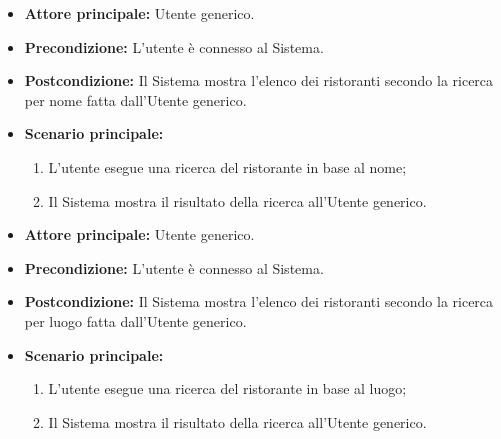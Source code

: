 \label{usecase:Ricerca ristoranti per nome}
\begin{itemize}
	\item \textbf{Attore principale:} Utente generico.

	\item \textbf{Precondizione:} L'utente è connesso al Sistema.

	\item \textbf{Postcondizione:} Il Sistema mostra l'elenco dei ristoranti secondo la ricerca per nome fatta dall'Utente generico.

	\item \textbf{Scenario principale:}
	      \begin{enumerate}
		      \item L'utente esegue una ricerca del ristorante in base al nome;
		      \item Il Sistema mostra il risultato della ricerca all'Utente generico.
	      \end{enumerate}
\end{itemize}

\label{usecase:Ricerca ristoranti per luogo}
\begin{itemize}
	\item \textbf{Attore principale:} Utente generico.

	\item \textbf{Precondizione:} L'utente è connesso al Sistema.

	\item \textbf{Postcondizione:} Il Sistema mostra l'elenco dei ristoranti secondo la ricerca per luogo fatta dall'Utente generico.

	\item \textbf{Scenario principale:}
	      \begin{enumerate}
		      \item L'utente esegue una ricerca del ristorante in base al luogo;
		      \item Il Sistema mostra il risultato della ricerca all'Utente generico.
	      \end{enumerate}
\end{itemize}


